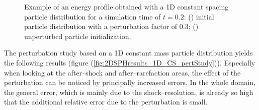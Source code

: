 \documentclass{report}
\begin{document}
\begin{figure}[!htbp]

\centering
\label{fig:2DSPHresults_perturbationComparisonProfiles}


\caption[Comparison of perturbed and unperturbed energy profiles]{Example of an energy profile obtained with a 1D constant spacing particle distribution for a simulation time of $t=0.2$: () initial particle distribution with a perturbation factor of $0.3$; () unperturbed particle initialization.}

\end{figure}

 The perturbation study based on a 1D constant mass particle distribution yields the following results (figure (\ref{fig:2DSPHresults_1D_CS_pertStudy})). Especially when looking at the after--shock and after--rarefaction areas, the effect of the perturbation can be noticed by principally increased  errors. In the whole domain, the general error, which is mainly due to the shock--resolution, is already so high that the additional relative error due to the perturbation is small.
\end{document}
